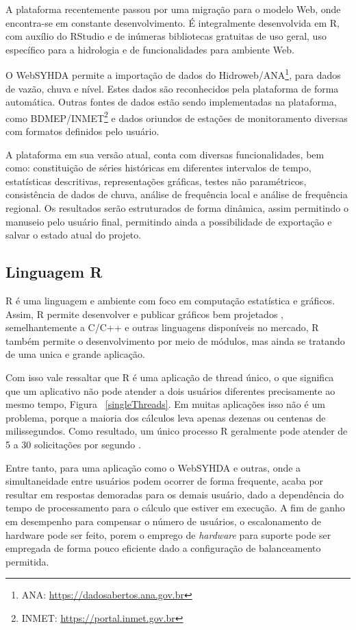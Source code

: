 \documentclass[12pt,english,brazil]{article}
\begin{document}
A plataforma recentemente passou por uma migração para o modelo Web, onde encontra-se em constante desenvolvimento. É integralmente desenvolvida em R, com auxílio do RStudio e de inúmeras bibliotecas gratuitas de uso geral, uso específico para a hidrologia e de funcionalidades para ambiente Web. %

O WebSYHDA permite a importação de dados do Hidroweb/ANA\footnote{ANA: \url{https://dadosabertos.ana.gov.br}}, para dados de vazão, chuva e nível. Estes dados são reconhecidos pela plataforma de forma automática. Outras fontes de dados estão sendo implementadas na plataforma, como BDMEP/INMET\footnote{INMET: \url{https://portal.inmet.gov.br}} e dados oriundos de estações de monitoramento diversas com formatos definidos pelo usuário.

A plataforma em sua versão atual, conta com diversas funcionalidades, bem como: constituição de séries históricas em diferentes intervalos de tempo, estatísticas descritivas, representações gráficas, testes não paramétricos, consistência de dados de chuva, análise de frequência local e análise de frequência regional. Os resultados serão estruturados de forma dinâmica, assim permitindo o manuseio pelo usuário final, permitindo ainda a possibilidade de exportação e salvar o estado atual do projeto. 

\subsection{Linguagem R} \label{sec:R}

R é uma linguagem e ambiente com foco em computação estatística e gráficos. Assim, R permite desenvolver e publicar gráficos bem projetados \cite{whatR}, semelhantemente a C/C++ e outras linguagens disponíveis no mercado, R também permite o desenvolvimento por meio de módulos, mas ainda se tratando de uma unica e grande aplicação.

Com isso vale ressaltar que R é uma aplicação de thread único, o que significa que um aplicativo não pode atender a dois usuários diferentes precisamente ao mesmo tempo, Figura ~\ref{singleThreads}. Em muitas aplicações isso não é um problema, porque a maioria dos cálculos leva apenas dezenas ou centenas de milissegundos. Como resultado, um único processo R geralmente pode atender de 5 a 30 solicitações por segundo \cite{ShinyappsEscalabilidade}. 

Entre tanto, para uma aplicação como o WebSYHDA e outras, onde a simultaneidade entre usuários podem ocorrer de forma frequente, acaba por resultar em respostas demoradas para os demais usuário, dado a dependência do tempo de processamento para o cálculo que estiver em execução. A fim de ganho em desempenho para compensar o número de usuários, o escalonamento de hardware pode ser feito, porem o emprego de \emph{hardware} para suporte pode ser empregada de forma pouco eficiente dado a configuração de balanceamento permitida. %
\end{document}
